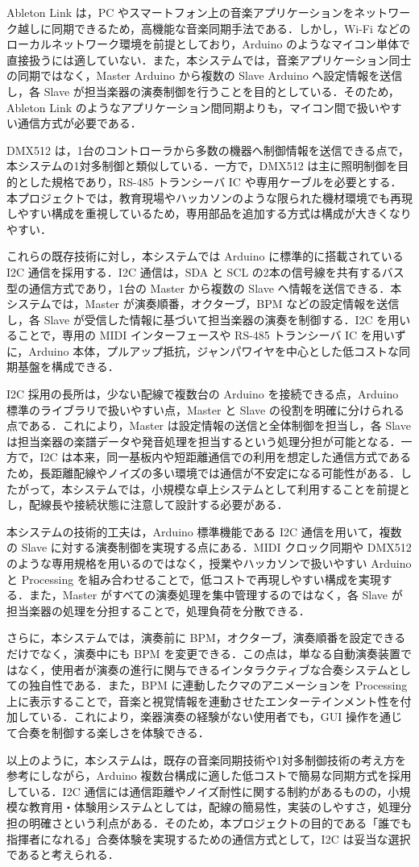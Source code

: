 Ableton Link は，PC やスマートフォン上の音楽アプリケーションをネットワーク越しに同期できるため，高機能な音楽同期手法である．しかし，Wi-Fi などのローカルネットワーク環境を前提としており，Arduino のようなマイコン単体で直接扱うには適していない．また，本システムでは，音楽アプリケーション同士の同期ではなく，Master Arduino から複数の Slave Arduino へ設定情報を送信し，各 Slave が担当楽器の演奏制御を行うことを目的としている．そのため，Ableton Link のようなアプリケーション間同期よりも，マイコン間で扱いやすい通信方式が必要である．

DMX512 は，1台のコントローラから多数の機器へ制御情報を送信できる点で，本システムの1対多制御と類似している．一方で，DMX512 は主に照明制御を目的とした規格であり，RS-485 トランシーバ IC や専用ケーブルを必要とする．本プロジェクトでは，教育現場やハッカソンのような限られた機材環境でも再現しやすい構成を重視しているため，専用部品を追加する方式は構成が大きくなりやすい．

これらの既存技術に対し，本システムでは Arduino に標準的に搭載されている I2C 通信を採用する．I2C 通信は，SDA と SCL の2本の信号線を共有するバス型の通信方式であり，1台の Master から複数の Slave へ情報を送信できる．本システムでは，Master が演奏順番，オクターブ，BPM などの設定情報を送信し，各 Slave が受信した情報に基づいて担当楽器の演奏を制御する．I2C を用いることで，専用の MIDI インターフェースや RS-485 トランシーバ IC を用いずに，Arduino 本体，プルアップ抵抗，ジャンパワイヤを中心とした低コストな同期基盤を構成できる．

I2C 採用の長所は，少ない配線で複数台の Arduino を接続できる点，Arduino 標準のライブラリで扱いやすい点，Master と Slave の役割を明確に分けられる点である．これにより，Master は設定情報の送信と全体制御を担当し，各 Slave は担当楽器の楽譜データや発音処理を担当するという処理分担が可能となる．一方で，I2C は本来，同一基板内や短距離通信での利用を想定した通信方式であるため，長距離配線やノイズの多い環境では通信が不安定になる可能性がある．したがって，本システムでは，小規模な卓上システムとして利用することを前提とし，配線長や接続状態に注意して設計する必要がある．

本システムの技術的工夫は，Arduino 標準機能である I2C 通信を用いて，複数の Slave に対する演奏制御を実現する点にある．MIDI クロック同期や DMX512 のような専用規格を用いるのではなく，授業やハッカソンで扱いやすい Arduino と Processing を組み合わせることで，低コストで再現しやすい構成を実現する．また，Master がすべての演奏処理を集中管理するのではなく，各 Slave が担当楽器の処理を分担することで，処理負荷を分散できる．

さらに，本システムでは，演奏前に BPM，オクターブ，演奏順番を設定できるだけでなく，演奏中にも BPM を変更できる．この点は，単なる自動演奏装置ではなく，使用者が演奏の進行に関与できるインタラクティブな合奏システムとしての独自性である．また，BPM に連動したクマのアニメーションを Processing 上に表示することで，音楽と視覚情報を連動させたエンターテインメント性を付加している．これにより，楽器演奏の経験がない使用者でも，GUI 操作を通じて合奏を制御する楽しさを体験できる．

以上のように，本システムは，既存の音楽同期技術や1対多制御技術の考え方を参考にしながら，Arduino 複数台構成に適した低コストで簡易な同期方式を採用している．I2C 通信には通信距離やノイズ耐性に関する制約があるものの，小規模な教育用・体験用システムとしては，配線の簡易性，実装のしやすさ，処理分担の明確さという利点がある．そのため，本プロジェクトの目的である「誰でも指揮者になれる」合奏体験を実現するための通信方式として，I2C は妥当な選択であると考えられる．
